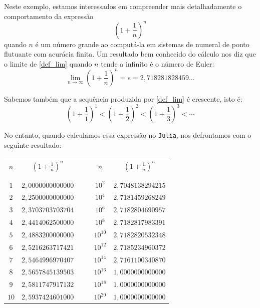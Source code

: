 \begin{ex}\label{ex:cancelamento_euler} Neste exemplo, estamos interessados em compreender mais detalhadamente o comportamento da expressão
\begin{equation}
  \label{def_lim}\left(1+\frac{1}{n}\right)^n
\end{equation}
quando $n$ é um número grande ao computá-la em sistemas de numeral de ponto flutuante com acurácia finita.
Um resultado bem conhecido do cálculo nos diz que o limite de \eqref{def_lim} quando $n$ tende a infinito é o número de Euler:
\begin{equation}\label{lim}
  \lim_{n\to \infty}\left(1+\frac{1}{n}\right)^n=e= 2,718281828459...
\end{equation}

Sabemos também que a sequência produzida por \eqref{def_lim} é crescente, isto é:
\begin{equation} \left(1+\frac{1}{1}\right)^1< \left(1+\frac{1}{2}\right)^2< \left(1+\frac{1}{3}\right)^3 < \cdots  \end{equation}

No entanto, quando calculamos essa expressão no \verb+Julia+, nos defrontamos com o seguinte resultado:
\begin{center}
\begin{tabular}{|c|c|c|c|c|}\hline &&&&\\[-0.3cm]
$n$ & $\left(1+\frac{1}{n}\right)^n$&$~~~~$&$n$ & $\left(1+\frac{1}{n}\right)^n$\\ &&&&\\[-0.3cm]\hline\\[-0.3cm]
$1$ & $2,0000000000000$ && $10^{2}$ & $2,7048138294215$ \\
$2$ & $2,2500000000000$ && $10^{4}$ & $2,7181459268249$ \\
$3$ & $2,3703703703704$ && $10^{6}$ & $2,7182804690957$ \\
$4$ & $2,4414062500000$ && $10^{8}$ & $2,7182817983391$ \\
$5$ & $2,4883200000000$ && $10^{10}$ & $2,7182820532348$ \\
$6$ & $2,5216263717421$ && $10^{12}$ & $2,7185234960372$ \\
$7$ & $2,5464996970407$ && $10^{14}$ & $2,7161100340870$ \\
$8$ & $2,5657845139503$ && $10^{16}$ & $1,0000000000000$ \\
$9$ & $2,5811747917132$ && $10^{18}$ & $1,0000000000000$ \\
$10$ & $2,5937424601000$ && $10^{20}$ & $1,0000000000000$ \\\hline
\end{tabular}
\end{center}


\end{ex}
